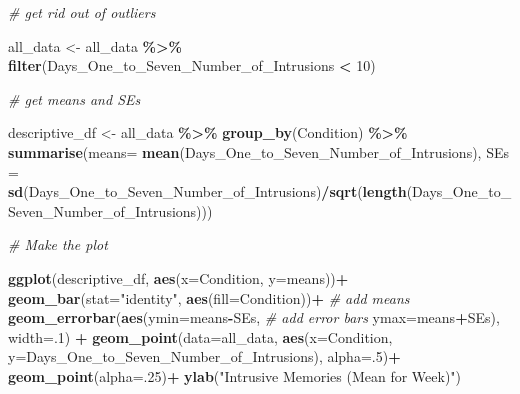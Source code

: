 \documentclass[
]{book}
\newenvironment{Shaded}{\begin{snugshade}}{\end{snugshade}}
\newcommand{\AttributeTok}[1]{\textcolor[rgb]{0.13,0.29,0.53}{#1}}
\newcommand{\CommentTok}[1]{\textcolor[rgb]{0.56,0.35,0.01}{\textit{#1}}}
\newcommand{\DecValTok}[1]{\textcolor[rgb]{0.00,0.00,0.81}{#1}}
\newcommand{\FunctionTok}[1]{\textcolor[rgb]{0.13,0.29,0.53}{\textbf{#1}}}
\newcommand{\NormalTok}[1]{#1}
\newcommand{\OtherTok}[1]{\textcolor[rgb]{0.56,0.35,0.01}{#1}}
\newcommand{\SpecialCharTok}[1]{\textcolor[rgb]{0.81,0.36,0.00}{\textbf{#1}}}
\newcommand{\StringTok}[1]{\textcolor[rgb]{0.31,0.60,0.02}{#1}}
\begin{document}
\begin{Shaded}
\begin{Highlighting}[]
\CommentTok{\# get rid out of outliers}

\NormalTok{all\_data  }\OtherTok{\textless{}{-}}\NormalTok{ all\_data }\SpecialCharTok{\%\textgreater{}\%}
             \FunctionTok{filter}\NormalTok{(Days\_One\_to\_Seven\_Number\_of\_Intrusions }\SpecialCharTok{\textless{}} \DecValTok{10}\NormalTok{)}

\CommentTok{\# get means and SEs}

\NormalTok{descriptive\_df }\OtherTok{\textless{}{-}}\NormalTok{ all\_data }\SpecialCharTok{\%\textgreater{}\%} 
                    \FunctionTok{group\_by}\NormalTok{(Condition) }\SpecialCharTok{\%\textgreater{}\%} 
                    \FunctionTok{summarise}\NormalTok{(}\AttributeTok{means=} \FunctionTok{mean}\NormalTok{(Days\_One\_to\_Seven\_Number\_of\_Intrusions),}
                              \AttributeTok{SEs =} \FunctionTok{sd}\NormalTok{(Days\_One\_to\_Seven\_Number\_of\_Intrusions)}\SpecialCharTok{/}\FunctionTok{sqrt}\NormalTok{(}\FunctionTok{length}\NormalTok{(Days\_One\_to\_Seven\_Number\_of\_Intrusions)))}

\CommentTok{\# Make the plot}

\FunctionTok{ggplot}\NormalTok{(descriptive\_df, }\FunctionTok{aes}\NormalTok{(}\AttributeTok{x=}\NormalTok{Condition, }\AttributeTok{y=}\NormalTok{means))}\SpecialCharTok{+} 
  \FunctionTok{geom\_bar}\NormalTok{(}\AttributeTok{stat=}\StringTok{"identity"}\NormalTok{, }\FunctionTok{aes}\NormalTok{(}\AttributeTok{fill=}\NormalTok{Condition))}\SpecialCharTok{+} \CommentTok{\# add means}
  \FunctionTok{geom\_errorbar}\NormalTok{(}\FunctionTok{aes}\NormalTok{(}\AttributeTok{ymin=}\NormalTok{means}\SpecialCharTok{{-}}\NormalTok{SEs,               }\CommentTok{\# add error bars}
                    \AttributeTok{ymax=}\NormalTok{means}\SpecialCharTok{+}\NormalTok{SEs), }\AttributeTok{width=}\NormalTok{.}\DecValTok{1}\NormalTok{) }\SpecialCharTok{+}
  \FunctionTok{geom\_point}\NormalTok{(}\AttributeTok{data=}\NormalTok{all\_data, }\FunctionTok{aes}\NormalTok{(}\AttributeTok{x=}\NormalTok{Condition, }\AttributeTok{y=}\NormalTok{Days\_One\_to\_Seven\_Number\_of\_Intrusions), }\AttributeTok{alpha=}\NormalTok{.}\DecValTok{5}\NormalTok{)}\SpecialCharTok{+}
  \FunctionTok{geom\_point}\NormalTok{(}\AttributeTok{alpha=}\NormalTok{.}\DecValTok{25}\NormalTok{)}\SpecialCharTok{+}
  \FunctionTok{ylab}\NormalTok{(}\StringTok{"Intrusive Memories (Mean for Week)"}\NormalTok{)}
\end{Highlighting}
\end{Shaded}
\end{document}
